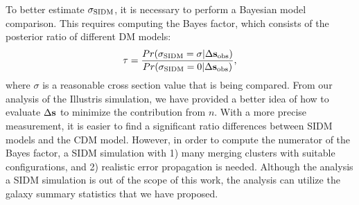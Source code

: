 To better estimate $\sigma_{\rm SIDM}$, it is necessary to perform a Bayesian model 
comparison. This requires computing the Bayes factor, which consists of the
posterior ratio of different DM models:
\begin{equation}
	\tau = \frac{Pr(\sigma_{\rm SIDM} = \sigma| \Delta {\bf s}_{\rm obs})}{Pr(\sigma_{\rm SIDM} = 0|
		\Delta {\bf s}_{\rm obs})},
\end{equation}
where $\sigma$ is a reasonable cross section value that is being compared.
From our analysis of the Illustris simulation, we have provided a better idea of how to evaluate 
$\Delta {\bf s}$ to minimize the contribution from $n$. 
With a more precise measurement, it is easier to find a significant ratio differences
between SIDM models and the CDM model. 
However, in order to compute the numerator of
the Bayes factor, a SIDM simulation with 1) many merging clusters with suitable
configurations, and 2) realistic error propagation is needed.  
Although the analysis a SIDM simulation is out of the scope of this work, 
the analysis can utilize the galaxy summary statistics that we have proposed.  



